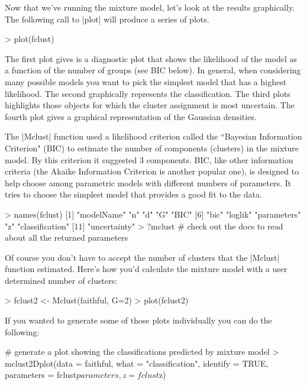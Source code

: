 Now that we've running the mixture model, let's look at the results graphically. The following call to |plot| will produce a series of plots.

\begin{R}
> plot(fclust)
\end{R}

The first plot gives is a diagnostic plot that shows the likelihood of the model as a function of  the number of groups (see BIC below). In general, when considering many possible models you want to pick the simplest model that has a highest likelihood. The second graphically represents the classification. The third plots highlights those objects for which the cluster assignment is most uncertain. The fourth plot gives a graphical representation of the Gaussian densities.

The |Mclust| function used a likelihood criterion called the ``Bayesian Information Criterion" (BIC) to estimate the number of components (clusters) in the mixture model. By this criterion it suggested 3 components. BIC, like other information criteria (the Akaike Information Criterion is another popular one), is designed to help choose among parametric models with different numbers of parameters. It tries to choose the simplest model that provides a good fit to the data.

\begin{R}
> names(fclust)
 [1] "modelName"      "n"              "d"              "G"              "BIC"
 [6] "bic"            "loglik"         "parameters"     "z"              "classification"
[11] "uncertainty"
> ?mclust  # check out the docs to read about all the returned parameters
\end{R}

Of course you don't have to accept the number of clusters that the |Mclust| function estimated. Here's how you'd calculate the mixture model with a user determined number of clusters:

\begin{R}
> fclust2 <- Mclust(faithful, G=2)
> plot(fclust2)
\end{R}



If you wanted to generate some of those plots individually you can do the following:

\begin{R}
# generate a plot showing the classifications predicted by mixture model
> mclust2Dplot(data = faithful, what = "classification", identify = TRUE,
    parameters = fclust$parameters, z = fclust$z)
\end{R}

